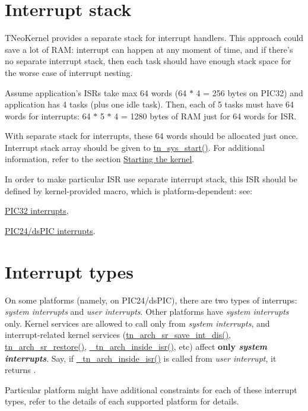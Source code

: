 \hypertarget{interrupts_interrupt_stack}{}\section{Interrupt stack}\label{interrupts_interrupt_stack}
T\+Neo\+Kernel provides a separate stack for interrupt handlers. This approach could save a lot of R\+A\+M\+: interrupt can happen at any moment of time, and if there's no separate interrupt stack, then each task should have enough stack space for the worse case of interrupt nesting.

Assume application's I\+S\+Rs take max 64 words (64 $\ast$ 4 = 256 bytes on P\+I\+C32) and application has 4 tasks (plus one idle task). Then, each of 5 tasks must have 64 words for interrupts\+: 64 $\ast$ 5 $\ast$ 4 = 1280 bytes of R\+A\+M just for 64 words for I\+S\+R.

With separate stack for interrupts, these 64 words should be allocated just once. Interrupt stack array should be given to {\ttfamily \hyperlink{tn__sys_8h_a62ab25d9d8ca01c02d368968f19e49bf}{tn\+\_\+sys\+\_\+start()}}. For additional information, refer to the section \hyperlink{quick_guide_starting_the_kernel}{Starting the kernel}.

In order to make particular I\+S\+R use separate interrupt stack, this I\+S\+R should be defined by kernel-\/provided macro, which is platform-\/dependent\+: see\+:


\begin{DoxyItemize}
\item \hyperlink{pic32_details_pic32_interrupts}{P\+I\+C32 interrupts},
\item \hyperlink{pic24_details_pic24_interrupts}{P\+I\+C24/ds\+P\+I\+C interrupts}.
\end{DoxyItemize}\hypertarget{interrupts_interrupt_types}{}\section{Interrupt types}\label{interrupts_interrupt_types}
On some platforms (namely, on P\+I\+C24/ds\+P\+I\+C), there are two types of interrups\+: {\itshape system interrupts} and {\itshape user interrupts}. Other platforms have {\itshape system interrupts} only. Kernel services are allowed to call only from {\itshape system interrupts}, and interrupt-\/related kernel services ({\ttfamily \hyperlink{tn__arch_8h_a7078b776570ca67a51b89d2746bdb6f7}{tn\+\_\+arch\+\_\+sr\+\_\+save\+\_\+int\+\_\+dis()}}, {\ttfamily \hyperlink{tn__arch_8h_aa755327bd8c4e4303c87c2b0cbed0f17}{tn\+\_\+arch\+\_\+sr\+\_\+restore()}}, {\ttfamily \hyperlink{tn__arch_8h_a34ffbae8b6837f7f3014bca9991e2272}{\+\_\+tn\+\_\+arch\+\_\+inside\+\_\+isr()}}, etc) affect {\bfseries only {\itshape system interrupts}}. Say, if {\ttfamily \hyperlink{tn__arch_8h_a34ffbae8b6837f7f3014bca9991e2272}{\+\_\+tn\+\_\+arch\+\_\+inside\+\_\+isr()}} is called from {\itshape user interrupt}, it returns {}.

Particular platform might have additional constraints for each of these interrupt types, refer to the details of each supported platform for details. 